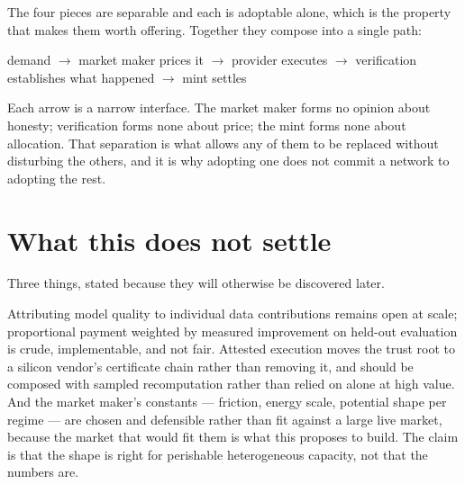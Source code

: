 \documentclass[11pt,a4paper]{article}
\begin{document}
The four pieces are separable and each is adoptable alone, which is the property
that makes them worth offering. Together they compose into a single path:

\begin{center}
demand $\rightarrow$ market maker prices it $\rightarrow$ provider executes
$\rightarrow$ verification establishes what happened $\rightarrow$ mint settles
\end{center}

Each arrow is a narrow interface. The market maker forms no opinion about
honesty; verification forms none about price; the mint forms none about
allocation. That separation is what allows any of them to be replaced without
disturbing the others, and it is why adopting one does not commit a network to
adopting the rest.

\section{What this does not settle}

Three things, stated because they will otherwise be discovered later.

Attributing model quality to individual data contributions remains open at scale;
proportional payment weighted by measured improvement on held-out evaluation is
crude, implementable, and not fair. Attested execution moves the trust root to a
silicon vendor's certificate chain rather than removing it, and should be
composed with sampled recomputation rather than relied on alone at high value.
And the market maker's constants --- friction, energy scale, potential shape per
regime --- are chosen and defensible rather than fit against a large live market,
because the market that would fit them is what this proposes to build. The claim
is that the shape is right for perishable heterogeneous capacity, not that the
numbers are.
\end{document}
